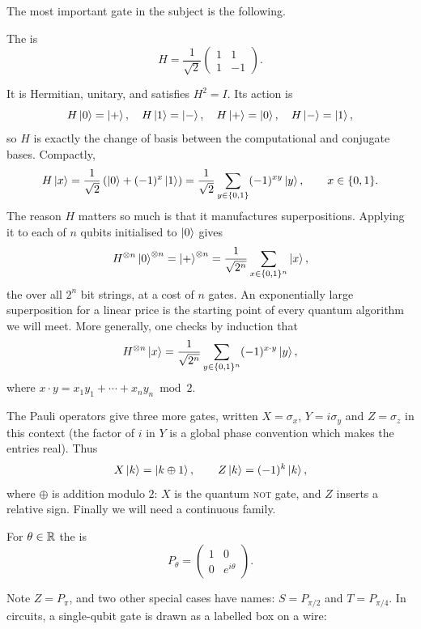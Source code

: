 \documentclass[a4paper]{scrartcl}
\begin{document}
The most important gate in the subject is the following.

\begin{definition}
	The  is
	$$H = \frac{1}{\sqrt2}\begin{pmatrix} 1 & 1 \\ 1 & -1\end{pmatrix}.$$
\end{definition}

It is Hermitian, unitary, and satisfies $H^2 = I$. Its action is
$$H\ket{0} = \ket{+}, \quad H\ket{1} = \ket{-}, \quad H\ket{+} = \ket{0},\quad H\ket{-} = \ket{1},$$
so $H$ is exactly the change of basis between the computational and conjugate bases. Compactly,
$$H\ket{x} = \frac{1}{\sqrt2}\left(\ket{0} + (-1)^x\ket{1}\right) = \frac{1}{\sqrt{2}}\sum_{y \in \{0,1\}}(-1)^{xy}\ket{y}, \qquad x \in \{0,1\}.$$
The reason $H$ matters so much is that it manufactures superpositions. Applying it to each of $n$ qubits initialised to $\ket{0}$ gives
$$H^{\otimes n}\ket{0}^{\otimes n} = \ket{+}^{\otimes n} = \frac{1}{\sqrt{2^n}}\sum_{x \in \{0,1\}^n}\ket{x},$$
the  over all $2^n$ bit strings, at a cost of $n$ gates. An exponentially large superposition for a linear price is the starting point of every quantum algorithm we will meet. More generally, one checks by induction that
$$H^{\otimes n}\ket{x} = \frac{1}{\sqrt{2^n}}\sum_{y\in\{0,1\}^n}(-1)^{x\cdot y}\ket{y},$$
where $x \cdot y = x_1y_1 + \cdots + x_ny_n \bmod 2$.

The Pauli operators give three more gates, written $X = \sigma_x$, $Y = i\sigma_y$ and $Z = \sigma_z$ in this context (the factor of $i$ in $Y$ is a global phase convention which makes the entries real). Thus
$$X\ket{k} = \ket{k\oplus 1}, \qquad Z\ket{k} = (-1)^k\ket{k},$$
where $\oplus$ is addition modulo $2$: $X$ is the quantum \textsc{not} gate, and $Z$ inserts a relative sign. Finally we will need a continuous family.

\begin{definition}
	For $\theta \in \mathbb{R}$ the  is
	$$P_\theta = \begin{pmatrix} 1 & 0 \\ 0 & e^{i\theta}\end{pmatrix}.$$
\end{definition}

Note $Z = P_\pi$, and two other special cases have names: $S = P_{\pi/2}$ and $T = P_{\pi/4}$. In circuits, a single-qubit gate is drawn as a labelled box on a wire:
\end{document}
